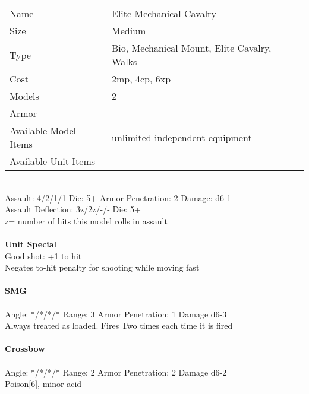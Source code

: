 \begin{tabular}{ll}
  Name & Elite Mechanical Cavalry \\
  Size & Medium\\
  Type & Bio, Mechanical Mount, Elite Cavalry, Walks\\
  Cost & 2mp, 4cp, 6xp\\
  Models & 2\\
  Armor & \\
  Available Model Items & unlimited independent equipment \\
  Available Unit Items &  \\
\end{tabular}

\ \\
Assault: 4/2/1/1 Die: 5+ Armor Penetration: 2 Damage: d6-1 \\
Assault Deflection: 3z/2z/-/- Die: 5+\\
\indent z= number of hits this model rolls in assault \\
\ \\

{\bf Unit Special} \\
Good shot: +1 to hit \\ Negates to-hit penalty for shooting while moving fast
\ \\
\ \\
{\bf SMG } \\
\ \\
Angle: */*/*/* Range: 3 Armor Penetration: 1 Damage d6-3 \\
\indent Always treated as loaded. Fires Two times each time it is fired \\



\ \\
{\bf Crossbow } \\
\ \\
Angle: */*/*/* Range: 2 Armor Penetration: 2 Damage d6-2 \\
\indent Poison[6], minor acid \\





